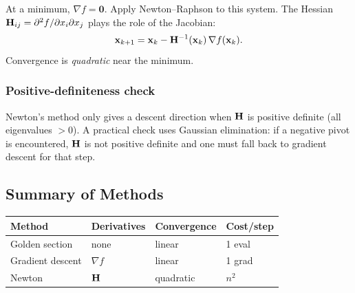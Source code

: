 At a minimum, $\nabla f = \mathbf{0}$.  Apply Newton–Raphson to this
system.  The Hessian $\mathbf{H}_{ij} = \partial^2 f/\partial x_i\partial x_j$
plays the role of the Jacobian:
\begin{equation}
  \mathbf{x}_{k+1} = \mathbf{x}_k - \mathbf{H}^{-1}(\mathbf{x}_k)\,\nabla f(\mathbf{x}_k).
  \label{eq:lec11:newton}
\end{equation}
Convergence is \emph{quadratic} near the minimum.

\subsubsection*{Positive-definiteness check}
Newton's method only gives a descent direction when $\mathbf{H}$ is
positive definite (all eigenvalues $>0$).  A practical check uses
Gaussian elimination: if a negative pivot is encountered, $\mathbf{H}$ is
not positive definite and one must fall back to gradient descent for
that step.


\subsection{Summary of Methods}\label{subsec:lec11:summary}

\begin{center}
\begin{tabular}{llll}
\toprule
Method & Derivatives & Convergence & Cost/step \\
\midrule
Golden section  & none        & linear  & 1 eval \\
Gradient descent & $\nabla f$ & linear  & 1 grad \\
Newton           & $\mathbf{H}$    & quadratic & $n^2$ \\
\bottomrule
\end{tabular}
\end{center}
